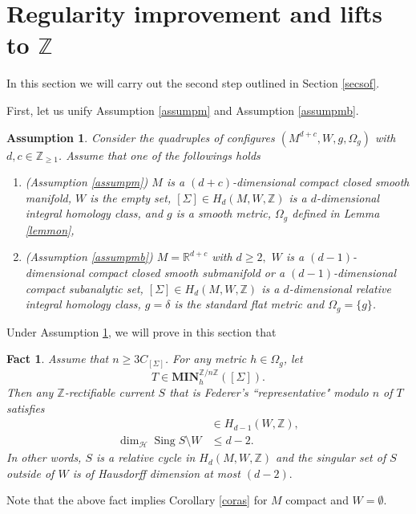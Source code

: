 \documentclass[11pt,a4paper]{amsart}
\numberwithin{equation}{section}
\newcommand{\sing}{\operatorname{Sing}}
\newcommand{\es}{\emptyset}
\newcommand{\mn}{\mathbf{MIN}}
\newcommand{\de}{\delta}
\newcommand{\Om}{\Omega}
\newcommand{\Si}{\Sigma}
\newcommand{\pd}{\partial}
\newcommand{\R}{\mathbb{R}}
\newcommand{\Z}{\mathbb{Z}}
\theoremstyle{plain}
\newtheorem{assump}{Assumption}[subsection]
\newtheorem{fact}{Fact}[subsection]
\theoremstyle{definition}
\numberwithin{equation}{subsection}
\begin{document}
\section{Regularity improvement and lifts to $\Z$}\label{secreg}
In this section we will carry out the second step outlined in Section \ref{secsof}.

First, let us unify Assumption \ref{assumpm} and Assumption \ref{assumpmb}.
\begin{assump}\label{assumpmc}
Consider the quadruples of configures $(M^{d+c},W,g,\Om_g)$ with $d,c\in\Z_{\ge 1}$. Assume that one of the followings holds
\begin{enumerate}
	\item (Assumption \ref{assumpm}) $M$ is a $(d+c)$-dimensional compact closed smooth manifold, $W$ is the empty set, $[\Si]\in H_d(M,W,\Z)$ is a $d$-dimensional integral homology class, and $g$ is a smooth metric, $\Om_g$ defined in Lemma \ref{lemmon},
\item (Assumption \ref{assumpmb}) $M=\R^{d+c}$ with $d\ge 2,$ $W$ is a $(d-1)$-dimensional compact closed smooth submanifold or a $(d-1)$-dimensional compact subanalytic  set, $[\Si]\in H_d(M,W,\Z)$  is a $d$-dimensional relative integral homology class, $g=\de$ is the standard flat metric and $\Om_g=\{g\}$.
\end{enumerate}
\end{assump}
Under Assumption \ref{assumpmc}, we will prove in this section that
\begin{fact}\label{fctfrmn}
Assume that $n\ge 3C_{[\Si]}$. For any metric $h\in \Om_g$, let $$T\in\mn^{\Z/n\Z}_h([\Si]).$$	Then any $\Z$-rectifiable current $S$ that is Federer's ``representative" modulo $n$ of $T$ satisfies 
\begin{align*}
	[\pd S]&\in H_{d-1}(W,\Z),\\\dim_{\mathcal{H}}\sing S\setminus W&\le d-2.
\end{align*}
In other words, $S$ is a relative cycle in $H_d(M,W,\Z)$ and the singular set of $S$ outside of $W $ is of Hausdorff dimension at most $(d-2).$
\end{fact}
Note that the above fact implies Corollary \ref{coras} for $M$ compact and $W=\es.$
\end{document}
